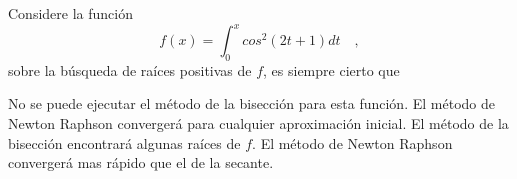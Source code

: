 \begin{pregunta}
\begin{cuerpo}
Considere la funci\'on
$$
\displaystyle
f(x)=\int_0^x cos^2(2t+1) dt\quad,
$$
sobre la b\'usqueda de ra\'ices positivas de $f$, es siempre cierto que
\end{cuerpo}
\begin{alternativas}
{No se puede ejecutar el m\'etodo de la bisecci\'on para esta funci\'on.}
{El m\'etodo de Newton Raphson converger\'a para cualquier aproximaci\'on inicial.}
{El m\'etodo de la bisecci\'on encontrar\'a algunas ra\'ices de $f$.}
{El m\'etodo de Newton Raphson converger\'a mas r\'apido que el de la secante.}
\end{alternativas}
\justificacion{0cm}
\end{pregunta}